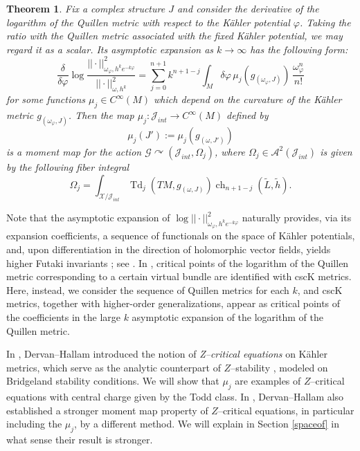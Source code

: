 \documentclass[12pt,reqno,a4paper]{amsart}
\numberwithin{equation}{section}
\DeclareMathOperator{\Td}{Td}
\DeclareMathOperator{\ch}{ch}
\newtheorem{mainthm}{Theorem}
\theoremstyle{definition}
\theoremstyle{remark}
\begin{document}
\begin{mainthm}\label{thm:mainA}
Fix a complex structure $J$ and consider the derivative of the logarithm of the Quillen metric with respect to the K\"ahler potential $\varphi$. Taking the ratio with the Quillen metric associated with the fixed K\"ahler potential, we may regard it as a scalar. Its asymptotic expansion as $k\rightarrow \infty$ has the following form:
\begin{equation*}
\frac{\delta}{\delta\varphi}\log \frac{||\cdot||^2_{\omega_\varphi,h^ke^{-k\varphi}}}{||\cdot||^2_{\omega,h^k}}=\sum_{j=0}^{n+1} k^{n+1-j} \int_M \delta\varphi \, \mu_j\left(g_{(\omega_\varphi,J)}\right) \,\frac{\omega_{\varphi}^n}{n!}
\end{equation*}
for some functions $\mu_j\in C^\infty(M)$ which depend on the curvature of the K\"ahler metric $g_{(\omega_\varphi,J)}$.
Then the map $\mu_j:\mathcal{J}_{int}\rightarrow C^\infty(M)$ defined by 
\begin{equation*}
\mu_j(J'):=\mu_j\left(g_{(\omega,J')}\right)
\end{equation*}
is a moment map for the action $\mathcal{G}\curvearrowright (\mathcal{J}_{int},\Omega_j)$, where $\Omega_j\in \mathcal{A}^2(\mathcal{J}_{int})$ is given by the following fiber integral
\begin{equation*}
\Omega_j=\int_{\mathcal{X}/\mathcal{J}_{int}}\Td_j(TM,g_{(\omega,J)})\ch_{n+1-j}(\widetilde{L},\widetilde{h}).
\end{equation*}
\end{mainthm}

Note that the asymptotic expansion of $\log||\cdot||^2_{\omega_\varphi,h^ke^{-k\varphi}}$ naturally provides, via its expansion coefficients, a sequence of functionals on the space of K\"ahler potentials, and, upon differentiation in the direction of holomorphic vector fields, yields higher Futaki invariants \cite{futaki2004asymptotic}; see \cite[Section 4]{eum2025partition}. In \cite{wernerwendland}, critical points of the logarithm of the Quillen metric corresponding to a certain virtual bundle are identified with cscK metrics. Here, instead, we consider the sequence of Quillen metrics for each $k$, and cscK metrics, together with higher-order generalizations, appear as critical points of the coefficients in the large $k$ asymptotic expansion of the logarithm of the Quillen metric.

In \cite{dervan2023universal}, Dervan--Hallam introduced the notion of \textit{Z--critical equations} on K\"ahler metrics, which serve as the analytic counterpart of $Z$--stability \cite{dervan2023stability}, modeled on Bridgeland stability conditions. We will show that $\mu_j$ are examples of $Z$--critical equations with central charge given by the Todd class. In \cite{dervan2023universal}, Dervan--Hallam also established a stronger moment map property of $Z$--critical equations, in particular including the $\mu_j$, by a different method. We will explain in Section \ref{spaceof} in what sense their result is stronger. 
\end{document}
